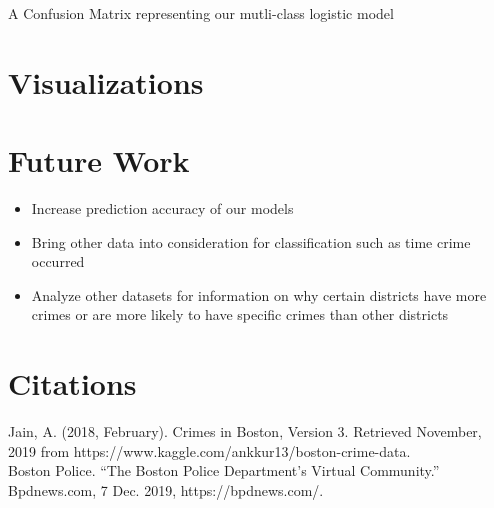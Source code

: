 \documentclass[a0,landscape]{a0poster}
\let\Section=\section
\def\section{\setcounter{equation}{0}\Section}
\newcommand{\1}{\bold{1}}
\begin{document}
\begin{multicols}{3}
\begin{center}
       A Confusion Matrix representing our mutli-class logistic model
   \end{center}


  

\section{Visualizations}



\section{Future Work}
\begin{itemize}
    \item Increase prediction accuracy of our models
    \item Bring other data into consideration for classification such as time crime occurred
    \item Analyze other datasets for information on why certain districts have more crimes or are more likely to have specific crimes than other districts 
\end{itemize}

\section*{Citations}

Jain, A. (2018, February). Crimes in Boston, Version 3. Retrieved November, 2019 from https://www.kaggle.com/ankkur13/boston-crime-data.\\
Boston Police. “The Boston Police Department's Virtual Community.” Bpdnews.com, 7 Dec. 2019, https://bpdnews.com/.





\end{multicols}
\end{document}
